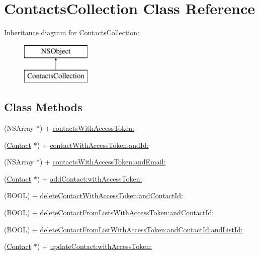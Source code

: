 \hypertarget{interface_contacts_collection}{\section{Contacts\-Collection Class Reference}
\label{interface_contacts_collection}
}
Inheritance diagram for Contacts\-Collection\-:\begin{figure}[H]
\begin{center}
\leavevmode
\includegraphics[height=2.000000cm]{interface_contacts_collection}
\end{center}
\end{figure}
\subsection*{Class Methods}
\begin{DoxyCompactItemize}
\item 
(N\-S\-Array $\ast$) + \hyperlink{interface_contacts_collection_ab8c91f486116cb12ded815bac299ce4c}{contacts\-With\-Access\-Token\-:}
\item 
(\hyperlink{interface_contact}{Contact} $\ast$) + \hyperlink{interface_contacts_collection_abd0ad20e87015e8284f8717ef296dc7c}{contact\-With\-Access\-Token\-:and\-Id\-:}
\item 
(N\-S\-Array $\ast$) + \hyperlink{interface_contacts_collection_a2bd4bd65ff939e81c705915cfc2cb011}{contacts\-With\-Access\-Token\-:and\-Email\-:}
\item 
(\hyperlink{interface_contact}{Contact} $\ast$) + \hyperlink{interface_contacts_collection_a72905faace2d74b337183dfe665fec6d}{add\-Contact\-:with\-Access\-Token\-:}
\item 
(B\-O\-O\-L) + \hyperlink{interface_contacts_collection_a0a9e3924034dd059a7d6697f826aa974}{delete\-Contact\-With\-Access\-Token\-:and\-Contact\-Id\-:}
\item 
(B\-O\-O\-L) + \hyperlink{interface_contacts_collection_af8199d98c27b451dddf6141900c468ab}{delete\-Contact\-From\-Lists\-With\-Access\-Token\-:and\-Contact\-Id\-:}
\item 
(B\-O\-O\-L) + \hyperlink{interface_contacts_collection_a38a710134be4cdb3d34d1f619a626d30}{delete\-Contact\-From\-List\-With\-Access\-Token\-:and\-Contact\-Id\-:and\-List\-Id\-:}
\item 
(\hyperlink{interface_contact}{Contact} $\ast$) + \hyperlink{interface_contacts_collection_a70de81543370507661b6df7c586c3a36}{update\-Contact\-:with\-Access\-Token\-:}
\end{DoxyCompactItemize}


